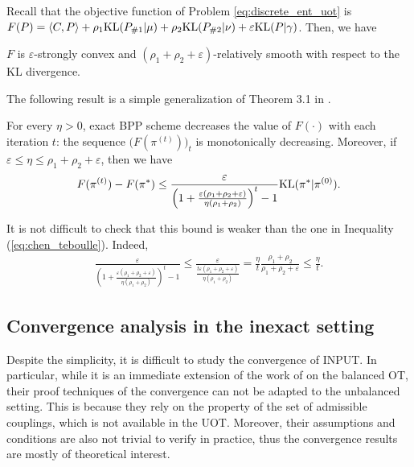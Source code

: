 Recall that the objective function of Problem \eqref{eq:discrete_ent_uot} is
$F(P) = \langle C, P \rangle + \rho_1 \text{KL}(P_{\# 1} | \mu)
+ \rho_2 \text{KL}(P_{\# 2} | \nu) + \varepsilon \text{KL}(P | \gamma)$. Then, we have
\begin{lemma}
  \label{lemma:convex-smoothness}
  $F$ is $\varepsilon$-strongly convex and $(\rho_1 + \rho_2 + \varepsilon)$-relatively smooth
  with respect to the KL divergence.
\end{lemma}
The following result is a simple generalization of Theorem 3.1 in \citep{Lu18}.
\begin{proposition}
  \label{prop:convergence-exact-sppa}
  For every $\eta > 0$, exact BPP scheme decreases the value of $F(\cdot)$ with each iteration $t$:
  the sequence $\big( F(\pi^{(t)}) \big)_t$ is monotonically decreasing.
  Moreover, if $\varepsilon \leq \eta \leq \rho_1 + \rho_2 + \varepsilon$,
  then we have
  \begin{align}
    F(\pi^{(t)}) - F(\pi^*)
    \leq \frac{\varepsilon}{\left( 1 +
    \frac{\varepsilon (\rho_1 + \rho_2 + \varepsilon)}{\eta (\rho_1 + \rho_2)} \right)^t - 1}
    \text{KL}(\pi^* | \pi^{(0)}).
  \end{align}
\end{proposition}
It is not difficult to check that this bound is weaker than the one in
Inequality (\ref{eq:chen_teboulle}). Indeed,
\begin{align}
  \frac{\varepsilon}{\left( 1 +
  \frac{\varepsilon (\rho_1 + \rho_2 + \varepsilon)}{\eta (\rho_1 + \rho_2)} \right)^t - 1}
  \leq \frac{\varepsilon}{\frac{t \varepsilon(\rho_1 + \rho_2 + \varepsilon)}{\eta (\rho_1 + \rho_2)}}
  = \frac{\eta}{t} \frac{\rho_1 + \rho_2}{\rho_1 + \rho_2 + \varepsilon}
  \leq \frac{\eta}{t}.
\end{align}

\subsection{Convergence analysis in the inexact setting}

Despite the simplicity, it is difficult to study the convergence of INPUT.
In particular, while it is an immediate extension of the work of \citet{Xie20} on the balanced OT,
their proof techniques of the convergence can not be adapted to the unbalanced setting.
This is because they rely on the property of the set of admissible couplings,
which is not available in the UOT. Moreover, their assumptions and conditions are also
not trivial to verify in practice, thus the convergence results are mostly of theoretical interest.


